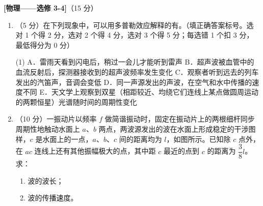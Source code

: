 \begin{question}
\textbf{[物理——选修 3-4]}（15 分）\nopagebreak[4]

\begin{enumerate}[leftmargin=2em, label=(\arabic*)]
  \item （5 分）在下列现象中，可以用多普勒效应解释的有\gkblank。（填正确答案标号。选对 1 个得 2 分，选对 2 个得 4 分，选对 3 个得 5 分；每选错 1 个扣 3 分，最低得分为 0 分）

\begin{gkopts}(1)
  \task A．雷雨天看到闪电后，稍过一会儿才能听到雷声
  \task B．超声波被血管中的血流反射后，探测器接收到的超声波频率发生变化
  \task C．观察者听到远去的列车发出的汽笛声，音调会变低
  \task D．同一声源发出的声波，在空气和水中传播的速度不同
  \task E．天文学上观察到双星（相距较近、均绕它们连线上某点做圆周运动的两颗恒星）光谱随时间的周期性变化
\end{gkopts}

  \pagebreak[4]
  \item （10 分）一振动片以频率 $f$ 做简谐振动时，固定在振动片上的两根细杆同步周期性地触动水面上 $a$、$b$ 两点，两波源发出的波在水面上形成稳定的干涉图样，$c$ 是水面上的一点，$a$、$b$、$c$ 间的距离均为 $l$，如图所示。已知除 $c$ 点外，在 $ac$ 连线上还有其他振幅极大的点，其中距 $c$ 最近的点到 $c$ 的距离为 $\dfrac{3}{8}l$。求：


  \begin{enumerate}[leftmargin=1.5em, label=（\roman*）]
    \item 波的波长；
    \item 波的传播速度。
  \end{enumerate}
\end{enumerate}
\end{question}
